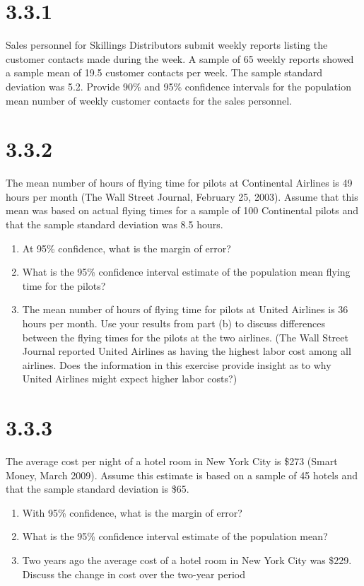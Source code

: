 \documentclass{article}
\begin{document}
\section*{3.3.1}
Sales personnel for Skillings Distributors submit weekly reports listing the customer contacts made during the week.
A sample of 65 weekly reports showed a sample mean of 19.5 customer contacts per week. The sample standard deviation was 5.2.
Provide 90\% and 95\% confidence intervals for the population mean number of weekly customer contacts for the sales personnel.

\section*{3.3.2}
The mean number of hours of flying time for pilots at Continental Airlines is 49 hours per month (The Wall Street Journal, February 25, 2003). Assume that this mean was based on actual flying times for a sample of 100 Continental pilots and that the sample standard deviation was 8.5 hours.
\begin{enumerate}
  \item At 95\% confidence, what is the margin of error?
  \item What is the 95\% confidence interval estimate of the population mean flying time for the pilots?
  \item The mean number of hours of flying time for pilots at United Airlines is 36 hours per month. Use your results from part (b) to discuss differences between the flying times for the pilots at the two airlines. (The Wall Street Journal reported United Airlines as having the highest labor cost among all airlines. Does the information in this exercise provide insight as to why United Airlines might expect higher labor costs?)
\end{enumerate}

\section*{3.3.3}
The average cost per night of a hotel room in New York City is \$273 (Smart Money, March 2009). Assume this estimate is based on a sample of 45 hotels and that the sample standard deviation is \$65.
\begin{enumerate}
  \item With 95\% confidence, what is the margin of error?
  \item What is the 95\% confidence interval estimate of the population mean?
  \item Two years ago the average cost of a hotel room in New York City was \$229. Discuss the change in cost over the two-year period
\end{enumerate}
\end{document}
